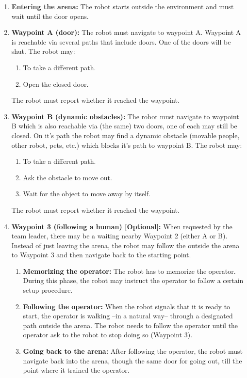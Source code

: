 \begin{enumerate}
\item \textbf{Entering the arena:} The robot starts outside the environment and must wait until the door opens.
\item \textbf{Waypoint A (door):} The robot must navigate to waypoint A. Waypoint A is reachable via several paths that include doors. One of the doors will be shut. The robot may:
\begin{enumerate}
\item To take a different path.
\item Open the closed door.
\end{enumerate}
The robot must report whether it reached the waypoint.

\item \textbf{Waypoint B (dynamic obstacles):} The robot must navigate to waypoint B which is also reachable via (the same) two doors, one of each may still be closed. On it's path the robot may find a dynamic obstacle (movable people, other robot, pets, etc.) which blocks it's path to waypoint B. The robot may:
\begin{enumerate}
\item To take a different path.
\item Ask the obstacle to move out.
\item Wait for the object to move away by itself.
\end{enumerate}
The robot must report whether it reached the waypoint.

\item \textbf{Waypoint 3 (following a human) [Optional]:} When requested by the team leader, there may be a  waiting nearby Waypoint 2 (either A or B). Instead of just leaving the arena, the robot may follow the  outside the arena to Waypoint 3 and then navigate back to the starting point.

\begin{enumerate}
\item \textbf{Memorizing the operator:} The robot has to memorize the operator. During this phase, the robot may instruct the operator to follow a certain setup procedure.
\item \textbf{Following the operator:} When the robot signals that it is ready to start, the operator is walking --in a natural way-- through a designated path outside the arena. The robot needs to follow the operator until the operator ask to the robot to stop doing so (Waypoint 3).
\item \textbf{Going back to the arena:} After following the operator, the robot must navigate back into the arena, though the same door for going out, till the point where it trained the operator.
\end{enumerate}


\end{enumerate}
